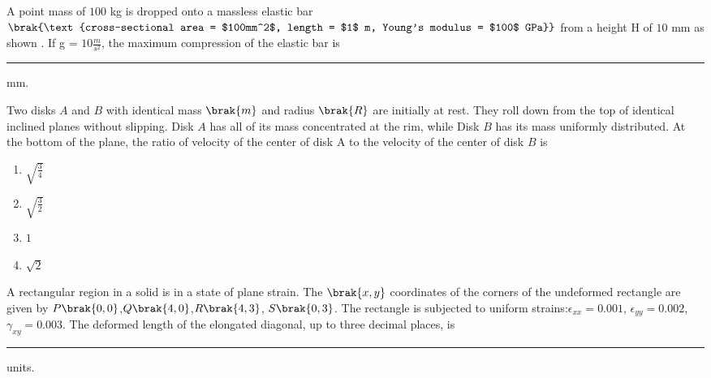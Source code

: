 \iffalse
	\title{2017-ME-40-52}
	\author{EE24Btech11006 - Arnav Mahishi}
	\section{me}
	\chapter{2017}
\fi
\item{A point mass of $100$ kg is dropped onto a massless elastic bar $\brak{\text{cross-sectional area = $100mm^2$, length = $1$ m, Young's modulus = $100$ GPa}}$ from a height H of $10$ mm as shown . If g = $10\frac{m}{s^2}$, the maximum compression of the elastic bar is \rule{3cm}{0.15mm} mm.
\begin{figure}[H]
\centering
{}%

\label{fig:my_label}
\end{figure}
}
\item{

Two disks $A$ and $B$ with identical mass $\brak{m}$ and radius $\brak{R}$ are initially at rest. They roll down from the top of identical inclined planes without slipping. Disk $A$ has all of its mass concentrated at the rim, while Disk $B$ has its mass uniformly distributed. At the bottom of the plane, the ratio of velocity of the center of disk A to the velocity of the center of disk $B$ is
\begin{multicols}{4}
\begin{enumerate}
\item $\sqrt{\frac{3}{4}}$
\item $\sqrt{\frac{3}{2}}$
\item $1$
\item $\sqrt{2}$
\end{enumerate}
\end{multicols}
}
\item{
A rectangular region in a solid is in a state of plane strain. The $\brak{x,y}$ coordinates of the corners of the undeformed rectangle are given by $P\brak{0,0}$,$Q\brak{4,0}$,$R\brak{4,3}$, $S\brak{0,3}$. The rectangle is subjected to uniform strains:$\epsilon_{xx} = 0.001$, $\epsilon_{yy} = 0.002$, $\gamma_{xy} = 0.003$. The deformed length of the elongated diagonal, up to three decimal places, is \rule{2cm}{0.15mm} units.
}
